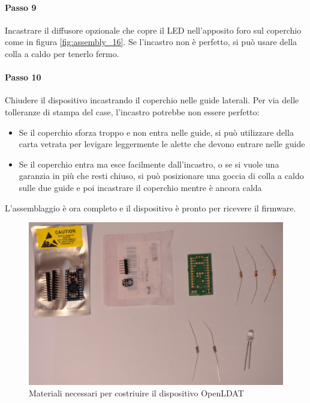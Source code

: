 \paragraph{Passo 9} Incastrare il diffusore opzionale che copre il LED nell'apposito foro sul coperchio come in figura \ref{fig:assembly_16}. Se l'incastro non è perfetto, si può usare della colla a caldo per tenerlo fermo.

\paragraph{Passo 10} Chiudere il dispositivo incastrando il coperchio nelle guide laterali. Per via delle tolleranze di stampa del case, l'incastro potrebbe non essere perfetto:\begin{itemize}
	\item Se il coperchio sforza troppo e non entra nelle guide, si può utilizzare della carta vetrata per levigare leggermente le alette che devono entrare nelle guide
	\item Se il coperchio entra ma esce facilmente dall'incastro, o se si vuole una garanzia in più che resti chiuso, si può posizionare una goccia di colla a caldo sulle due guide e poi incastrare il coperchio mentre è ancora calda
\end{itemize}

L'assemblaggio è ora completo e il dispositivo è pronto per ricevere il firmware.

\begin{figure}[H]
	\centering
	\includegraphics[width=\textwidth]{Dispositivo_files/assembly_01.jpg}
	\caption{Materiali necessari per costriuire il dispositivo OpenLDAT}
	\label{fig:assembly_01}
\end{figure}

